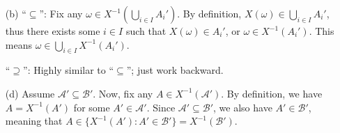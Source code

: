 \begin{enumerate}
\begin{pf}
\begin{enumerate}
\item[(b)]
``\(\subseteq\)'': Fix any \(\omega\in X^{-1}(\bigcup_{i\in I}A_i')\). By
definition, \(X(\omega)\in\bigcup_{i\in I}A_i'\), thus there exists some \(i\in
I\) such that \(X(\omega)\in A_i'\), or \(\omega\in X^{-1}(A_i')\). This means
\(\omega\in \bigcup_{i\in I}X^{-1}(A_i')\).

``\(\supseteq\)'': Highly similar to ``\(\subseteq\)''; just work backward.

\item[(d)] Assume \(\mathcal{A}'\subseteq \mathcal{B}'\). Now, fix any \(A\in
X^{-1}(\mathcal{A}')\). By definition, we have \(A=X^{-1}(A')\) for some
\(A'\in\mathcal{A}'\). Since \(\mathcal{A}'\subseteq \mathcal{B}'\), we also
have \(A'\in\mathcal{B}'\), meaning that
\(A\in\{X^{-1}(A'):A'\in\mathcal{B}'\}=X^{-1}(\mathcal{B}')\).
\end{enumerate}
\end{pf}
\end{enumerate}
